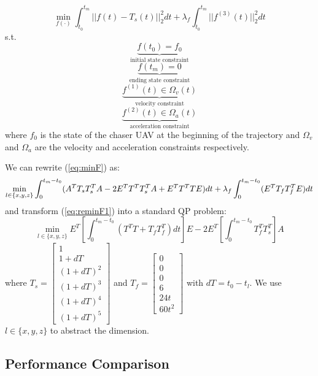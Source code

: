 \begin{equation}\label{eq:minF}
\min_{f(\cdot)} \int_{t_0}^{t_m} ||f(t)-T_s(t)||^2_{2}dt + \lambda_f\int_{t_0}^{t_m} ||f^{(3)}(t)||^2_{2}dt
\end{equation}
\indent s.t.
\begin{equation}
\underbrace{f(t_0)=f_0}_{\text{initial state constraint}}
\end{equation}
\begin{equation}
\underbrace{f(t_m)=0}_{\text{ending state constraint}}
\end{equation}
\begin{equation}
\underbrace{f^{(1)}(t) \in \Omega_{v}(t)}_{\text{velocity constraint}}
\end{equation}
\begin{equation}
\underbrace{f^{(2)}(t) \in \Omega_{a}(t)}_{\text{acceleration constraint}}
\end{equation}
\noindent
where $f_0$ is the state of the chaser UAV at the beginning of the trajectory and $\Omega_v$ and $\Omega_a$ are the velocity and acceleration constraints respectively.

We can rewrite (\ref{eq:minF}) as:
\begin{equation}\label{eq:reminF1}
\min_{l\in\{x,y,z\}}\int_{0}^{t_m-t_0} (A^TT_sT_s^TA-2E^TT^TT_s^TA+E^TT^TTE)dt + \lambda_f\int_{0}^{t_m-t_0} (E^TT_fT_f^TE)dt\\
\end{equation}
\noindent
and transform (\ref{eq:reminF1}) into a standard QP problem:
\begin{equation}\label{eq:reminF2}
\min_{l\in\{x,y,z\}}E^T[\int_{0}^{t_m-t_0}(T^TT+T_fT_f^T)dt]E-2E^T[\int_{0}^{t_m-t_0}T_f^TT_s^T]A
\end{equation}
\noindent
where $T_s = \begin{bmatrix}1\\1+dT\\(1+dT)^2\\(1+dT)^3\\(1+dT)^4\\(1+dT)^5\end{bmatrix}$ and $T_f=\begin{bmatrix}0\\0\\0\\6\\24t\\60t^2\end{bmatrix}$ with $dT=t_0-t_l$. We use $l\in\{x,y,z\}$ to abstract the dimension.

\subsection{Performance Comparison}



\newpage